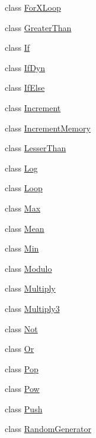 \begin{DoxyCompactItemize}
\item 
class \hyperlink{classorg_1_1jgap_1_1gp_1_1function_1_1_for_x_loop}{For\-X\-Loop}
\item 
class \hyperlink{classorg_1_1jgap_1_1gp_1_1function_1_1_greater_than}{Greater\-Than}
\item 
class \hyperlink{classorg_1_1jgap_1_1gp_1_1function_1_1_if}{If}
\item 
class \hyperlink{classorg_1_1jgap_1_1gp_1_1function_1_1_if_dyn}{If\-Dyn}
\item 
class \hyperlink{classorg_1_1jgap_1_1gp_1_1function_1_1_if_else}{If\-Else}
\item 
class \hyperlink{classorg_1_1jgap_1_1gp_1_1function_1_1_increment}{Increment}
\item 
class \hyperlink{classorg_1_1jgap_1_1gp_1_1function_1_1_increment_memory}{Increment\-Memory}
\item 
class \hyperlink{classorg_1_1jgap_1_1gp_1_1function_1_1_lesser_than}{Lesser\-Than}
\item 
class \hyperlink{classorg_1_1jgap_1_1gp_1_1function_1_1_log}{Log}
\item 
class \hyperlink{classorg_1_1jgap_1_1gp_1_1function_1_1_loop}{Loop}
\item 
class \hyperlink{classorg_1_1jgap_1_1gp_1_1function_1_1_max}{Max}
\item 
class \hyperlink{classorg_1_1jgap_1_1gp_1_1function_1_1_mean}{Mean}
\item 
class \hyperlink{classorg_1_1jgap_1_1gp_1_1function_1_1_min}{Min}
\item 
class \hyperlink{classorg_1_1jgap_1_1gp_1_1function_1_1_modulo}{Modulo}
\item 
class \hyperlink{classorg_1_1jgap_1_1gp_1_1function_1_1_multiply}{Multiply}
\item 
class \hyperlink{classorg_1_1jgap_1_1gp_1_1function_1_1_multiply3}{Multiply3}
\item 
class \hyperlink{classorg_1_1jgap_1_1gp_1_1function_1_1_not}{Not}
\item 
class \hyperlink{classorg_1_1jgap_1_1gp_1_1function_1_1_or}{Or}
\item 
class \hyperlink{classorg_1_1jgap_1_1gp_1_1function_1_1_pop}{Pop}
\item 
class \hyperlink{classorg_1_1jgap_1_1gp_1_1function_1_1_pow}{Pow}
\item 
class \hyperlink{classorg_1_1jgap_1_1gp_1_1function_1_1_push}{Push}
\item 
class \hyperlink{classorg_1_1jgap_1_1gp_1_1function_1_1_random_generator}{Random\-Generator}

\end{DoxyCompactItemize}
